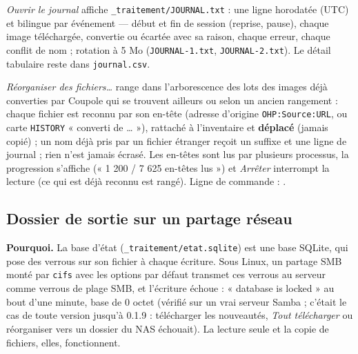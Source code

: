 \emph{Ouvrir le journal} affiche \texttt{\_traitement/JOURNAL.txt} : une ligne horodatée (UTC) et bilingue par
événement --- début et fin de session (reprise, pause), chaque image téléchargée, convertie ou écartée avec sa raison,
chaque erreur, chaque conflit de nom ; rotation à 5 Mo (\texttt{JOURNAL-1.txt}, \texttt{JOURNAL-2.txt}). Le détail
tabulaire reste dans \texttt{journal.csv}.

\emph{Réorganiser des fichiers…} range dans l'arborescence des lots des images déjà converties par Coupole qui se
trouvent ailleurs ou selon un ancien rangement : chaque fichier est reconnu par son en-tête (adresse d'origine
\texttt{OHP:Source:URL}, ou carte \texttt{HISTORY} « converti de … »), rattaché à l'inventaire et \textbf{déplacé}
(jamais copié) ; un nom déjà pris par un fichier étranger reçoit un suffixe et une ligne de journal ; rien n'est
jamais écrasé. Les en-têtes sont lus par plusieurs processus, la progression s'affiche (« 1 200 / 7 625 en-têtes
lus ») et \emph{Arrêter} interrompt la lecture (ce qui est déjà reconnu est rangé). Ligne de commande :
.

\subsection{Dossier de sortie sur un partage réseau}\label{sec:partage}
\textbf{Pourquoi.} La base d'état (\texttt{\_traitement/etat.sqlite}) est une base SQLite, qui pose des verrous sur
son fichier à chaque écriture. Sous Linux, un partage SMB monté par \texttt{cifs} avec les options par défaut
transmet ces verrous au serveur comme verrous de plage SMB, et l'écriture échoue : « database is locked » au bout
d'une minute, base de 0 octet (vérifié sur un vrai serveur Samba ; c'était le cas de toute version jusqu'à 0.1.9 :
télécharger les nouveautés, \emph{Tout télécharger} ou réorganiser vers un dossier du NAS échouait). La lecture
seule et la copie de fichiers, elles, fonctionnent.

